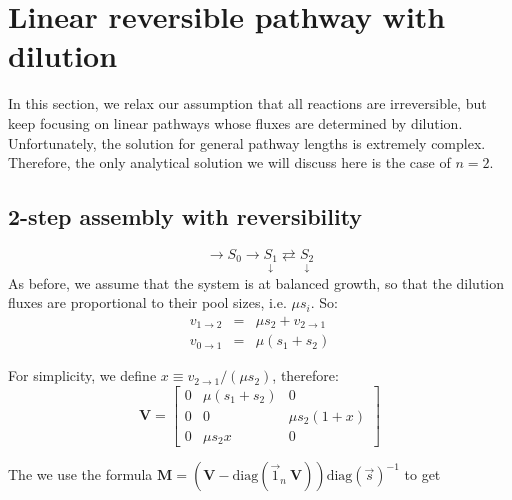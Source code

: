 \documentclass{article}
\newcommand{\flux}[2]{\ensuremath{v_{{#1} \rightarrow {#2}}}}
\begin{document}
\section{Linear reversible pathway with dilution}
In this section, we relax our assumption that all reactions are irreversible, but keep focusing on linear pathways whose fluxes are determined by dilution. Unfortunately, the solution for general pathway lengths is extremely complex. Therefore, the only analytical solution we will discuss here is the case of $n = 2$.

\subsection{2-step assembly with reversibility}

\begin{equation}
    \rightarrow S_0 
    \rightarrow \underset{\downarrow}{S_1}
    \rightleftarrows \underset{\downarrow}{S_2}
\end{equation}
As before, we assume that the system is at balanced growth, so that the dilution fluxes are proportional to their pool sizes, i.e. $\mu s_i$. So:
\begin{eqnarray}
    \flux{1}{2} &=& \mu s_2 + \flux{2}{1}\\
    \flux{0}{1} &=& \mu (s_1 + s_2)
\end{eqnarray}

For simplicity, we define $x \equiv \flux{2}{1} / (\mu s_2)$, therefore:
\[\mathbf{V} =
    \begin{bmatrix}
        0 & \mu (s_1 + s_2) & 0\\
        0 & 0 & \mu s_2 (1 + x) \\
        0 & \mu s_2 x & 0
    \end{bmatrix}
\]

The we use the formula $\mathbf{M} = \left(\mathbf{V} - \text{diag}(\vec{1}_n~\mathbf{V})\right) \text{diag}(\vec{s})^{-1}$ to get
\end{document}
